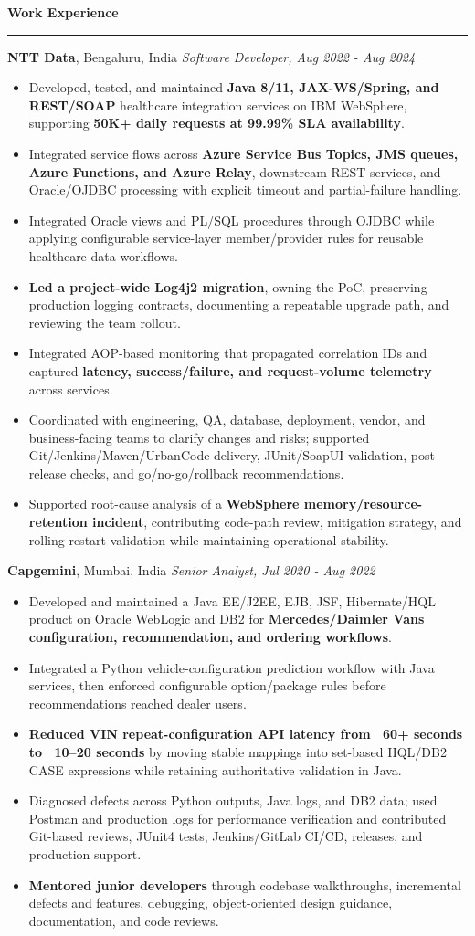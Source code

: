 \documentclass[11pt,letterpaper]{article}
\newcommand{\ressection}[1]{\Needspace{6\baselineskip}\vspace{8pt}\par\textbf{#1}\par\vspace{2pt}\hrule\vspace{5pt}}
\begin{document}
\ressection{Work Experience}
\textbf{NTT Data}, Bengaluru, India \hfill \textit{Software Developer, Aug 2022 - Aug 2024}
\begin{itemize}
  \item Developed, tested, and maintained \textbf{Java 8/11, JAX-WS/Spring, and REST/SOAP} healthcare integration services on IBM WebSphere, supporting \textbf{50K+ daily requests at 99.99\% SLA availability}.
  \item Integrated service flows across \textbf{Azure Service Bus Topics, JMS queues, Azure Functions, and Azure Relay}, downstream REST services, and Oracle/OJDBC processing with explicit timeout and partial-failure handling.
  \item Integrated Oracle views and PL/SQL procedures through OJDBC while applying configurable service-layer member/provider rules for reusable healthcare data workflows.
  \item \textbf{Led a project-wide Log4j2 migration}, owning the PoC, preserving production logging contracts, documenting a repeatable upgrade path, and reviewing the team rollout.
  \item Integrated AOP-based monitoring that propagated correlation IDs and captured \textbf{latency, success/failure, and request-volume telemetry} across services.
  \item Coordinated with engineering, QA, database, deployment, vendor, and business-facing teams to clarify changes and risks; supported Git/Jenkins/Maven/UrbanCode delivery, JUnit/SoapUI validation, post-release checks, and go/no-go/rollback recommendations.
  \item Supported root-cause analysis of a \textbf{WebSphere memory/resource-retention incident}, contributing code-path review, mitigation strategy, and rolling-restart validation while maintaining operational stability.
\end{itemize}
\textbf{Capgemini}, Mumbai, India \hfill \textit{Senior Analyst, Jul 2020 - Aug 2022}
\begin{itemize}
  \item Developed and maintained a Java EE/J2EE, EJB, JSF, Hibernate/HQL product on Oracle WebLogic and DB2 for \textbf{Mercedes/Daimler Vans configuration, recommendation, and ordering workflows}.
  \item Integrated a Python vehicle-configuration prediction workflow with Java services, then enforced configurable option/package rules before recommendations reached dealer users.
  \item \textbf{Reduced VIN repeat-configuration API latency from ~60+ seconds to ~10--20 seconds} by moving stable mappings into set-based HQL/DB2 CASE expressions while retaining authoritative validation in Java.
  \item Diagnosed defects across Python outputs, Java logs, and DB2 data; used Postman and production logs for performance verification and contributed Git-based reviews, JUnit4 tests, Jenkins/GitLab CI/CD, releases, and production support.
  \item \textbf{Mentored junior developers} through codebase walkthroughs, incremental defects and features, debugging, object-oriented design guidance, documentation, and code reviews.
\end{itemize}
\end{document}
